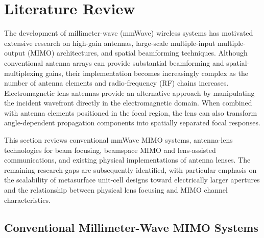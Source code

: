 



\section{Literature Review}
\label{sec:literature_review}

The development of millimeter-wave (mmWave) wireless systems has
motivated extensive research on high-gain antennas, large-scale
multiple-input multiple-output (MIMO) architectures, and spatial
beamforming techniques. Although conventional antenna arrays can
provide substantial beamforming and spatial-multiplexing gains, their
implementation becomes increasingly complex as the number of antenna
elements and radio-frequency (RF) chains increases. Electromagnetic
lens antennas provide an alternative approach by manipulating the
incident wavefront directly in the electromagnetic domain. When
combined with antenna elements positioned in the focal region, the
lens can also transform angle-dependent propagation components into
spatially separated focal responses.

This section reviews conventional mmWave MIMO systems, antenna-lens
technologies for beam focusing, beamspace MIMO and lens-assisted
communications, and existing physical implementations of antenna
lenses. The remaining research gaps are subsequently identified, with
particular emphasis on the scalability of metasurface unit-cell
designs toward electrically larger apertures and the relationship
between physical lens focusing and MIMO channel characteristics.


\subsection{Conventional Millimeter-Wave MIMO Systems}
\label{subsec:conventional_mmwave_mimo}

